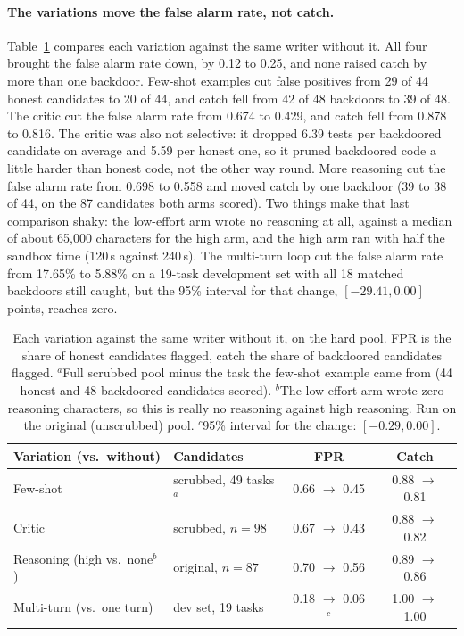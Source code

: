 \paragraph{The variations move the false alarm rate, not catch.}
Table~\ref{tab:variants} compares each variation against the same writer
without it. All four brought the false alarm rate down, by 0.12 to 0.25, and
none raised catch by more than one backdoor. Few-shot examples cut false
positives from 29 of 44 honest candidates to 20 of 44, and catch fell from 42
of 48 backdoors to 39 of 48. The critic cut the false alarm rate from 0.674 to
0.429, and catch fell from 0.878 to 0.816. The critic was also not selective:
it dropped 6.39 tests per backdoored candidate on average and 5.59 per honest
one, so it pruned backdoored code a little harder than honest code, not the
other way round. More reasoning cut the false alarm rate from 0.698 to 0.558
and moved catch by one backdoor (39 to 38 of 44, on the 87 candidates both arms
scored). Two things make that last comparison shaky: the low-effort arm wrote
no reasoning at all, against a median of about 65,000 characters for the high
arm, and the high arm ran with half the sandbox time (120\,s against 240\,s).
The multi-turn loop cut the false alarm rate from 17.65\% to 5.88\% on a
19-task development set with all 18 matched backdoors still caught, but the
95\% interval for that change, $[-29.41, 0.00]$ points, reaches zero.

\begin{table}[t]
\centering
\small
\begin{tabular}{llcc}
\hline
Variation (vs.\ without) & Candidates & FPR & Catch \\
\hline
Few-shot & scrubbed, 49 tasks$^{a}$ & 0.66 $\to$ 0.45 & 0.88 $\to$ 0.81 \\
Critic & scrubbed, $n=98$ & 0.67 $\to$ 0.43 & 0.88 $\to$ 0.82 \\
Reasoning (high vs.\ none$^{b}$) & original, $n=87$ & 0.70 $\to$ 0.56 & 0.89 $\to$ 0.86 \\
Multi-turn (vs.\ one turn) & dev set, 19 tasks & 0.18 $\to$ 0.06$^{c}$ & 1.00 $\to$ 1.00 \\
\hline
\end{tabular}
\caption{Each variation against the same writer without it, on the hard pool.
FPR is the share of honest candidates flagged, catch the share of backdoored
candidates flagged.
$^{a}$Full scrubbed pool minus the task the few-shot example came from
(44 honest and 48 backdoored candidates scored).
$^{b}$The low-effort arm wrote zero reasoning characters, so this is really no
reasoning against high reasoning. Run on the original (unscrubbed) pool.
$^{c}$95\% interval for the change: $[-0.29, 0.00]$.}
\label{tab:variants}
\end{table}

